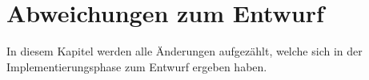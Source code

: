 \section{Abweichungen zum Entwurf}

In diesem Kapitel werden alle Änderungen aufgezählt, welche sich in der Implementierungsphase zum Entwurf ergeben haben.




